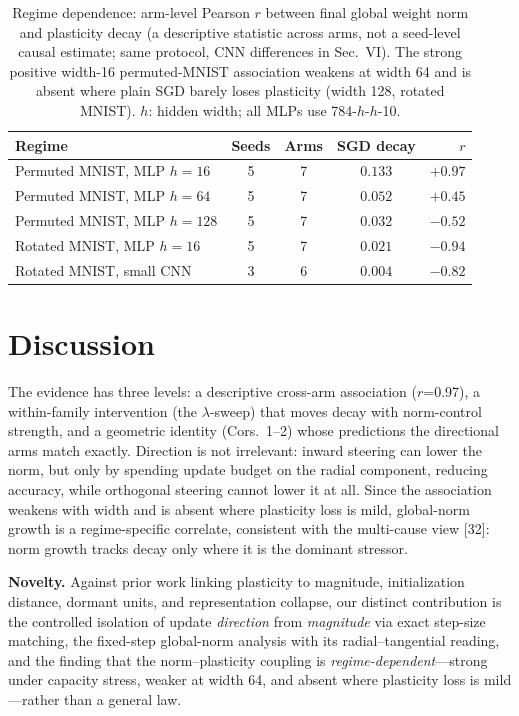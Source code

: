 \documentclass[conference]{IEEEtran}
\begin{document}
\begin{table}[tb]
\caption{Regime dependence: arm-level Pearson $r$ between final global weight norm and plasticity decay (a descriptive statistic across arms, not a seed-level causal estimate; same protocol, CNN differences in Sec.~VI). The strong positive width-16 permuted-MNIST association weakens at width 64 and is absent where plain SGD barely loses plasticity (width 128, rotated MNIST). $h$: hidden width; all MLPs use 784-$h$-$h$-10.}
\label{tab:regime}
\centering
\renewcommand{\arraystretch}{1.05}
\footnotesize
\setlength{\tabcolsep}{5pt}
\begin{tabular}{@{}lcc c r@{}}
\toprule
\textbf{Regime} & \textbf{Seeds} & \textbf{Arms} & {\textbf{SGD decay}} & \textbf{$r$}\\
\midrule
Permuted MNIST, MLP $h{=}16$  & 5 & 7 & {$0.133$} & $+0.97$\\
Permuted MNIST, MLP $h{=}64$  & 5 & 7 & {$0.052$} & $+0.45$\\
Permuted MNIST, MLP $h{=}128$ & 5 & 7 & {$0.032$} & $-0.52$\\
Rotated MNIST, MLP $h{=}16$   & 5 & 7 & {$0.021$} & $-0.94$\\
Rotated MNIST, small CNN      & 3 & 6 & {$0.004$} & $-0.82$\\
\bottomrule
\end{tabular}
\end{table}

\section{Discussion}\label{sec:disc}
The evidence has three levels: a descriptive cross-arm association ($r$=0.97), a within-family intervention (the $\lambda$-sweep) that moves decay with norm-control strength, and a geometric identity (Cors.~1--2) whose predictions the directional arms match exactly. Direction is not irrelevant: inward steering can lower the norm, but only by spending update budget on the radial component, reducing accuracy, while orthogonal steering cannot lower it at all. Since the association weakens with width and is absent where plasticity loss is mild, global-norm growth is a regime-specific correlate, consistent with the multi-cause view [32]: norm growth tracks decay only where it is the dominant stressor.

\textbf{Novelty.} Against prior work linking plasticity to magnitude, initialization
distance, dormant units, and representation collapse, our distinct contribution is the
controlled isolation of update \emph{direction} from \emph{magnitude} via exact
step-size matching, the fixed-step global-norm analysis with its radial--tangential
reading, and the finding that the norm--plasticity coupling is
\emph{regime-dependent}---strong under capacity stress, weaker at width 64, and absent where plasticity loss is mild---rather than a general law.
\end{document}

